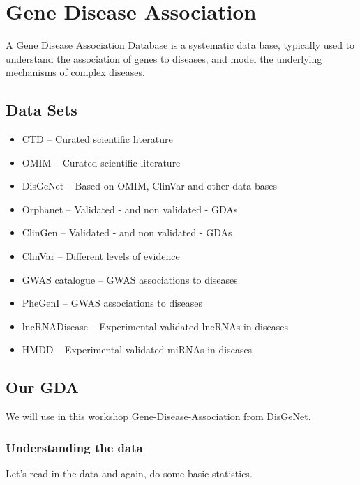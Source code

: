 \documentclass[
]{book}
\begin{document}
\hypertarget{gene-disease-association}{%
\section{Gene Disease Association}\label{gene-disease-association}}

A Gene Disease Association Database is a systematic data base, typically used to understand the association of genes to diseases, and model the underlying mechanisms of complex diseases.

\hypertarget{data-sets-1}{%
\subsection{Data Sets}\label{data-sets-1}}

\begin{itemize}
\item
  CTD -- Curated scientific literature
\item
  OMIM -- Curated scientific literature
\item
  DisGeNet -- Based on OMIM, ClinVar and other data bases
\item
  Orphanet -- Validated - and non validated - GDAs
\item
  ClinGen -- Validated - and non validated - GDAs
\item
  ClinVar -- Different levels of evidence
\item
  GWAS catalogue -- GWAS associations to diseases
\item
  PheGenI -- GWAS associations to diseases
\item
  lncRNADisease -- Experimental validated lncRNAs in diseases
\item
  HMDD -- Experimental validated miRNAs in diseases
\end{itemize}

\hypertarget{our-gda}{%
\subsection{Our GDA}\label{our-gda}}

We will use in this workshop Gene-Disease-Association from DisGeNet.

\hypertarget{understanding-the-data-1}{%
\subsubsection{Understanding the data}\label{understanding-the-data-1}}

Let's read in the data and again, do some basic statistics.
\end{document}
